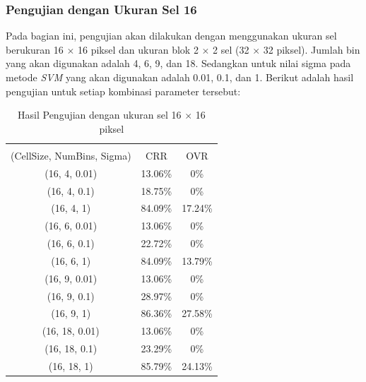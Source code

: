 \subsubsection{Pengujian dengan Ukuran Sel 16}
Pada bagian ini, pengujian akan dilakukan dengan menggunakan ukuran sel berukuran 16 $\times$ 16 piksel dan ukuran blok 2 $\times$ 2 sel (32 $\times$ 32 piksel). Jumlah bin yang akan digunakan adalah 4, 6, 9, dan 18. Sedangkan untuk nilai sigma pada metode \textit{SVM} yang akan digunakan adalah 0.01, 0.1, dan 1. Berikut adalah hasil pengujian untuk setiap kombinasi parameter tersebut:
\begin{longtable}[c]{|c|c|c|}
	\caption{Hasil Pengujian dengan ukuran sel 16 $\times$ 16 piksel}
	\label{tab:HasilPengujianSel16}\\
	\hline
	\begin{tabular}[c]{@{}c@{}}Parameter\\ (CellSize, NumBins, Sigma)\end{tabular} & CRR     & OVR     \\ \hline
	\endhead
	(16, 4, 0.01)                                                                   & 13.06\% & 0\% \\ \hline
	(16, 4, 0.1)                                                                    & 18.75\% & 0\%     \\ \hline
	(16, 4, 1)                                                                      & 84.09\% & 17.24\%     \\ \hline
	(16, 6, 0.01)                                                                   & 13.06\% & 0\%  \\ \hline
	(16, 6, 0.1)                                                                    & 22.72\% & 0\%     \\ \hline
	(16, 6, 1)                                                                      & 84.09\% & 13.79\%     \\ \hline
	(16, 9, 0.01)                                                                   & 13.06\% & 0\%  \\ \hline
	(16, 9, 0.1)                                                                    & 28.97\% & 0\%     \\ \hline
	(16, 9, 1)                                                                      & {\color[HTML]{FE0000} 86.36\%} & {\color[HTML]{FE0000} 27.58\%}     \\ \hline
	(16, 18, 0.01)                                                                  & 13.06\% & 0\%  \\ \hline
	(16, 18, 0.1)                                                                   & 23.29\% & 0\%     \\ \hline
	(16, 18, 1)                                                                     & 85.79\% & 24.13\%     \\ \hline
\end{longtable}
